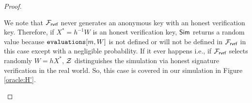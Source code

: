 \begin{proof}
\begin{itemize}
		We note that $ \mathcal{F}_{\textsf{rvrf}} $ never generates an anonymous key with an honest verification key. Therefore, if $ X^* = h^{-1}W $ is an honest verification key, $ \mathsf{Sim} $ returns a random value because  $ \texttt{evaluations}[m,W] $ is not defined or will not be defined in $ \mathcal{F}_{\textsf{rvrf}} $ in this case except with a negligible probability. If it ever happens i.e., if $ \mathcal{F}_{\textsf{rvrf}} $ selects randomly $ W = hX^* $, $ \mathcal{Z} $ distinguishes the simulation via honest signature verification in the real world. So, this case is covered in our simulation in Figure \ref{oracle:H'}.
		
		
		\begin{figure}
			\centering
			
			\noindent{}
\end{figure}
\end{itemize}
\end{proof}
